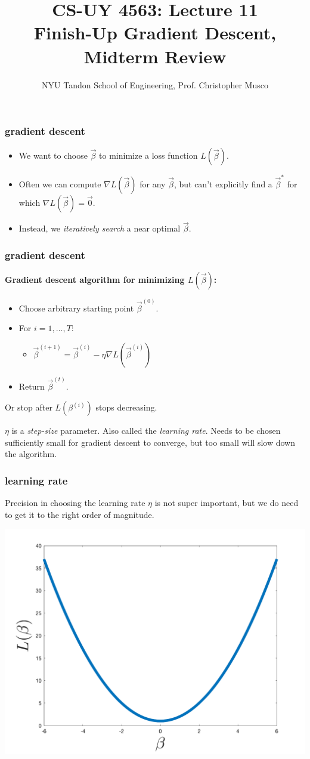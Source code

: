 \documentclass[handout,compress]{beamer}
\title{CS-UY 4563: Lecture 11 \\ Finish-Up Gradient Descent, Midterm Review}
\author{NYU Tandon School of Engineering, Prof. Christopher Musco}
\date{}
\begin{document}
\begin{frame}
	\titlepage 
\end{frame}


\begin{frame}
	\frametitle{gradient descent}
	\begin{itemize}
		\item We want to choose $\vec{\beta}$ to minimize a loss function $L(\vec{\beta})$.
		\item Often we can compute $\nabla L(\vec{\beta})$ for any $\vec{\beta}$, but can't explicitly find a $\vec{\beta}^*$ for which $\nabla L(\vec{\beta}) = \vec{0}$. 
		\item Instead, we \emph{iteratively search} a near optimal $\vec{\beta}$.
	\end{itemize}
\end{frame}

\begin{frame}
	\frametitle{gradient descent}
	\textbf{Gradient descent algorithm for minimizing $L(\vec{\beta})$:}
	\begin{itemize}
		\item Choose arbitrary starting point $\vec{\beta}^{(0)}$.
		\item For $i = 1,\ldots, T$:
		\begin{itemize}
			\item $\vec{\beta}^{(i+1)} = \vec{\beta}^{(i)} - \eta \nabla L(\vec{\beta}^{(i)})$
		\end{itemize}
		\item Return $\vec{\beta}^{(t)}$.
	\end{itemize}
	Or stop after $L(\beta^{(i)})$ stops decreasing.

	$\eta$ is a \emph{step-size} parameter. Also called the \emph{learning rate}. Needs to be chosen sufficiently small for gradient descent to converge, but too small will slow down the algorithm. 
\end{frame}

\begin{frame}
	\frametitle{learning rate}
	Precision in choosing the learning rate $\eta$ is not super important, but we do need to get it to the right order of magnitude. 
	\begin{center}
		\includegraphics[width=.7\textwidth]{simple1d.png}
	\end{center}
\end{frame}
\end{document}
